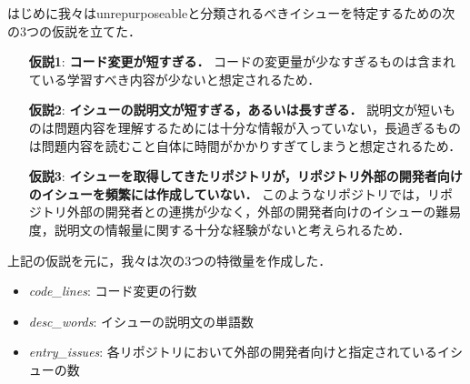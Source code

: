 はじめに我々はunrepurposeableと分類されるべきイシューを特定するための次の3つの仮説を立てた．
\begin{itemize}
\item[\textbf{仮説1}: ] \textbf{コード変更が短すぎる．} コードの変更量が少なすぎるものは含まれている学習すべき内容が少ないと想定されるため．
\item[\textbf{仮説2}: ] \textbf{イシューの説明文が短すぎる，あるいは長すぎる．} 説明文が短いものは問題内容を理解するためには十分な情報が入っていない，長過ぎるものは問題内容を読むこと自体に時間がかかりすぎてしまうと想定されるため．
\item[\textbf{仮説3}: ] \textbf{イシューを取得してきたリポジトリが，リポジトリ外部の開発者向けのイシューを頻繁には作成していない．} このようなリポジトリでは，リポジトリ外部の開発者との連携が少なく，外部の開発者向けのイシューの難易度，説明文の情報量に関する十分な経験がないと考えられるため．
\end{itemize}


上記の仮説を元に，我々は次の3つの特徴量を作成した．


\begin{itemize}
  \item \textit{code\_lines}: コード変更の行数
  \item \textit{desc\_words}: イシューの説明文の単語数
  \item \textit{entry\_issues}: 各リポジトリにおいて外部の開発者向けと指定されているイシューの数
\end{itemize}



